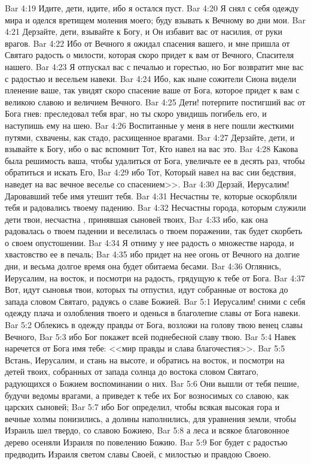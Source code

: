 \vs Bar 4:19 Идите, дети, идите, ибо я остался пуст.
\vs Bar 4:20 Я снял с себя одежду мира и оделся вретищем моления моего; буду взывать к Вечному во дни мои.
\vs Bar 4:21 Дерзайте, дети, взывайте к Богу, и Он избавит вас от насилия, от руки врагов.
\vs Bar 4:22 Ибо от Вечного я ожидал спасения вашего, и мне пришла от Святаго радость о милости, которая скоро придет к вам от Вечного, Спасителя нашего.
\vs Bar 4:23 Я отпускал вас с печалью и горестью, но Бог возвратит мне вас с радостью и весельем навеки.
\vs Bar 4:24 Ибо, как ныне сожители Сиона видели пленение ваше, так увидят скоро спасение ваше от Бога, которое придет к вам с великою славою и величием Вечного.
\vs Bar 4:25 Дети! потерпите постигший вас от Бога гнев: преследовал тебя враг, но ты скоро увидишь погибель его, и наступишь ему на шею.
\vs Bar 4:26 Воспитанные у меня в неге пошли жесткими путями, схвачены, как стадо, расхищенное врагами.
\vs Bar 4:27 Дерзайте, дети, и взывайте к Богу, ибо о вас вспомнит Тот, Кто навел на вас это.
\vs Bar 4:28 Какова была решимость ваша, чтобы удалиться от Бога, увеличьте ее в десять раз, чтобы обратиться и искать Его,
\vs Bar 4:29 ибо Тот, Который навел на вас сии бедствия, наведет на вас вечное веселье со спасением>>.
\vs Bar 4:30 Дерзай, Иерусалим! Даровавший тебе имя утешит тебя.
\vs Bar 4:31 Несчастны те, которые оскорбляли тебя и радовались твоему падению.
\vs Bar 4:32 Несчастны города, которым служили дети твои, несчастна , принявшая сыновей твоих,
\vs Bar 4:33 ибо, как она радовалась о твоем падении и веселилась о твоем поражении, так будет скорбеть о своем опустошении.
\vs Bar 4:34 Я отниму у нее радость о множестве  народа, и хвастовство ее  в печаль;
\vs Bar 4:35 ибо придет на нее огонь от Вечного на долгие дни, и весьма долгое время она будет обитаема бесами.
\vs Bar 4:36 Оглянись, Иерусалим, на восток, и посмотри на радость, грядущую к тебе от Бога.
\vs Bar 4:37 Вот, идут сыновья твои, которых ты отпустил, идут собранные от востока до запада словом Святаго, радуясь о славе Божией.
\vs Bar 5:1 Иерусалим! сними с себя одежду плача и озлобления твоего и оденься в благолепие славы от Бога навеки.
\vs Bar 5:2 Облекись в одежду правды от Бога, возложи на голову твою венец славы Вечного,
\vs Bar 5:3 ибо Бог покажет всей поднебесной славу твою.
\vs Bar 5:4 Навек наречется от Бога имя тебе: <<мир правды и слава благочестия>>.
\vs Bar 5:5 Встань, Иерусалим, и стань на высоте, и обратись на восток, и посмотри на детей твоих, собранных от запада солнца до востока словом Святаго, радующихся о Божием воспоминании о них.
\vs Bar 5:6 Они вышли от тебя пешие, будучи ведомы врагами, а приведет к тебе их Бог возносимых со славою, как царских сыновей;
\vs Bar 5:7 ибо Бог определил, чтобы всякая высокая гора и вечные холмы понизились, а долины наполнились, для уравнения земли, чтобы Израиль шел твердо, со славою Божиею,
\vs Bar 5:8 а леса и всякое благовонное дерево осеняли Израиля по повелению Божию.
\vs Bar 5:9 Бог будет с радостью предводить Израиля светом славы Своей, с милостью и правдою Своею.
